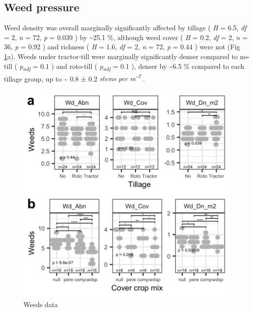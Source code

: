 \documentclass[
]{article}
\begin{document}
\hypertarget{weed-pressure}{%
\subsection{Weed pressure}\label{weed-pressure}}

Weed density was overall marginally significantly affected by tillage (
\emph{H} = 6.5,
\emph{df} = 2,
\emph{n} = 72,
\emph{p} = 0.039
) by
\textasciitilde25.1 \%,
although weed cover (
\emph{H} = 0.2,
\emph{df} = 2,
\emph{n} = 36,
\emph{p} = 0.92
) and richness (
\emph{H} = 1.6,
\emph{df} = 2,
\emph{n} = 72,
\emph{p} = 0.44
) were not
(Fig \ref{fig:weedsFig}a).
Weeds under tractor-till were marginally significantly denser compared to no-till (
\emph{p\textsubscript{adj}} = 0.1
) and roto-till (
\emph{p\textsubscript{adj}} = 0.1
), denser by
\textasciitilde6.5 \%
compared to each tillage group,
up to
\textasciitilde{} 0.8 ±
0.2 \emph{stems per m\textsuperscript{-2}}
.

\begin{figure}
\includegraphics[width=12.5in]{../figs/weedPlot} \caption{Weeds data}\label{fig:weedsFig}
\end{figure}
\end{document}
